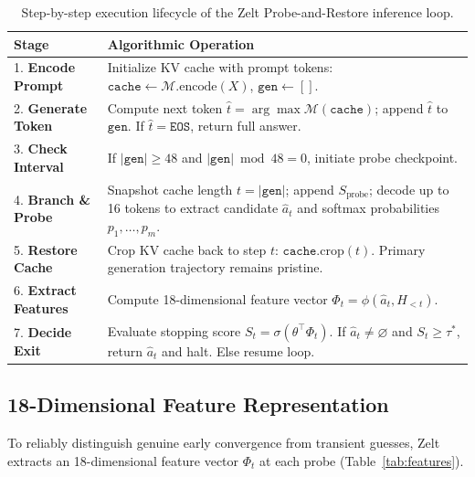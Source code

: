 \documentclass[11pt]{article}
\begin{document}
\begin{table}[ht]
\centering
\small
\begin{tabularx}{\linewidth}{lX}
\toprule
\textbf{Stage} & \textbf{Algorithmic Operation} \\
\midrule
1. \textbf{Encode Prompt} & Initialize KV cache with prompt tokens: $\texttt{cache} \leftarrow \mathcal{M}.\mathrm{encode}(X)$, $\texttt{gen} \leftarrow []$. \\
2. \textbf{Generate Token} & Compute next token $\hat{t} = \arg\max \mathcal{M}(\texttt{cache})$; append $\hat{t}$ to $\texttt{gen}$. If $\hat{t} = \texttt{EOS}$, return full answer. \\
3. \textbf{Check Interval} & If $|\texttt{gen}| \ge 48$ and $|\texttt{gen}| \bmod 48 = 0$, initiate probe checkpoint. \\
4. \textbf{Branch \& Probe} & Snapshot cache length $t = |\texttt{gen}|$; append $S_{\mathrm{probe}}$; decode up to 16 tokens to extract candidate $\hat{a}_t$ and softmax probabilities $p_1, \dots, p_m$. \\
5. \textbf{Restore Cache} & Crop KV cache back to step $t$: $\texttt{cache}.\mathrm{crop}(t)$. Primary generation trajectory remains pristine. \\
6. \textbf{Extract Features} & Compute 18-dimensional feature vector $\Phi_t = \phi(\hat{a}_t, H_{<t})$. \\
7. \textbf{Decide Exit} & Evaluate stopping score $S_t = \sigma(\theta^\top \Phi_t)$. If $\hat{a}_t \neq \varnothing$ and $S_t \ge \tau^*$, return $\hat{a}_t$ and halt. Else resume loop. \\
\bottomrule
\end{tabularx}
\caption{Step-by-step execution lifecycle of the Zelt Probe-and-Restore inference loop.}
\label{tab:alg_steps}
\end{table}

\subsection{18-Dimensional Feature Representation}
To reliably distinguish genuine early convergence from transient guesses, Zelt extracts an 18-dimensional feature vector $\Phi_t$ at each probe (Table~\ref{tab:features}).
\end{document}
